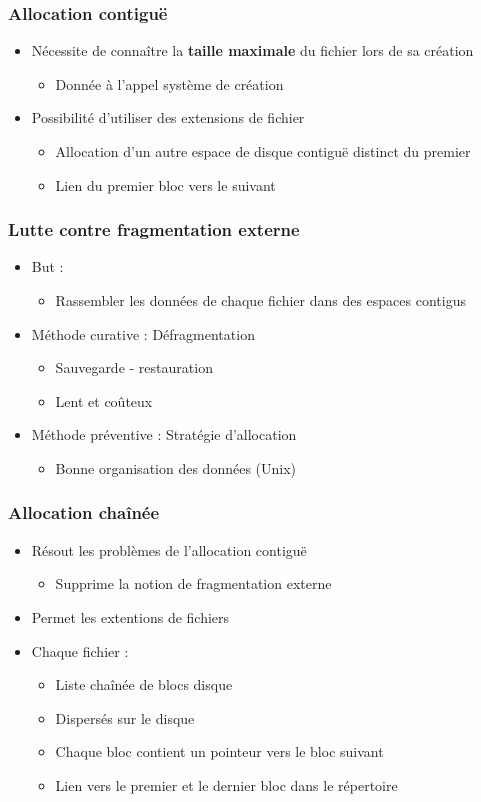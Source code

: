 \begin{frame}
\frametitle{Allocation contiguë}
\begin{itemize}
\item Nécessite de connaître la \textbf{taille maximale} du fichier lors de sa création
\begin{itemize}
\item Donnée à l'appel système de création
\end{itemize}
\item Possibilité d'utiliser des extensions de fichier
\begin{itemize}
\item Allocation d'un autre espace de disque contiguë distinct du premier
\item Lien du premier bloc vers le suivant
\end{itemize}
\end{itemize}
\end{frame}

\begin{frame}
\frametitle{Lutte contre fragmentation externe}
\begin{itemize}
\item But : 
\begin{itemize}
\item Rassembler les données de chaque fichier dans des espaces contigus
\end{itemize}
\item Méthode curative : Défragmentation
\begin{itemize}
\item Sauvegarde - restauration
\item Lent et coûteux
\end{itemize}
\item Méthode préventive : Stratégie d’allocation
\begin{itemize}
\item Bonne organisation des données (Unix)
\end{itemize}
\end{itemize}
\end{frame}

\begin{frame}
\frametitle{Allocation chaînée}
\begin{itemize}
\item Résout les problèmes de l'allocation contiguë
\begin{itemize}
\item Supprime la notion de fragmentation externe
\end{itemize}
\item Permet les extentions de fichiers
\item Chaque fichier :
\begin{itemize}
\item Liste chaînée de blocs disque
\item Dispersés sur le disque
\item Chaque bloc contient un pointeur vers le bloc suivant
\item Lien vers le premier et le dernier bloc dans le répertoire
\end{itemize}
\end{itemize}
\end{frame}

